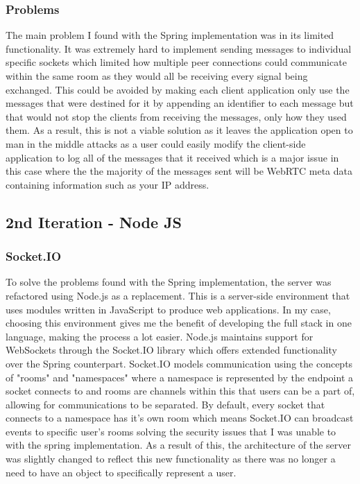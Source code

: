 \documentclass[]{report}
\begin{document}
				\subsubsection*{Problems}
				The main problem I found with the Spring implementation was in its limited functionality. It was extremely hard to implement sending messages to individual specific sockets which limited how multiple peer connections could communicate within the same room as they would all be receiving every signal being exchanged. This could be avoided by making each client application only use the messages that were destined for it by appending an identifier to each message but that would not stop the clients from receiving the messages, only how they used them. As a result, this is not a viable solution as it leaves the application open to man in the middle attacks as a user could easily modify the client-side application to log all of the messages that it received which is a major issue in this case where the the majority of the messages sent will be WebRTC meta data containing information such as your IP address.
				
			\subsection{2nd Iteration - Node JS}
				\subsubsection*{Socket.IO}
				To solve the problems found with the Spring implementation, the server was refactored using Node.js as a replacement. This is a server-side environment that uses modules written in JavaScript to produce web applications. In my case, choosing this environment gives me the benefit of developing the full stack in one language, making the process a lot easier. Node.js maintains support for WebSockets through the Socket.IO library which offers extended functionality over the Spring counterpart. Socket.IO models communication using the concepts of "rooms" and "namespaces" where a namespace is represented by the endpoint a socket connects to and rooms are channels within this that users can be a part of, allowing for communications to be separated. By default, every socket that connects to a namespace has it's own room which means Socket.IO can broadcast events to specific user's rooms solving the security issues that I was unable to with the spring implementation. As a result of this, the architecture of the server was slightly changed to reflect this new functionality as there was no longer a need to have an object to specifically represent a user. 
				
\end{document}
